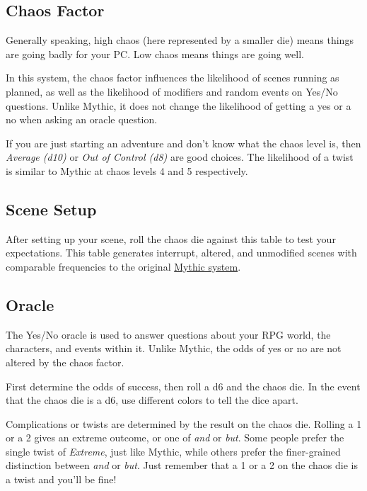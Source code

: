 \begin{multicols}{2}
\clearfloat{}

\subsection{Chaos Factor}
Generally speaking, high chaos (here represented by a smaller die) means things
are going badly for your PC\@. Low chaos means things are going well.

In this system, the chaos factor influences the likelihood of scenes running as
planned, as well as the likelihood of modifiers and random events on Yes/No
questions. Unlike Mythic, it does not change the likelihood of getting a yes or
a no when asking an oracle question.

If you are just starting an adventure and don't know what the chaos level is,
then \emph{Average (d10)} or \emph{Out of Control (d8)} are good choices.
The likelihood of a twist is similar to Mythic at chaos levels 4 and 5 respectively.



\subsection{Scene Setup}
After setting up your scene, roll the chaos die against this table to test your
expectations. This table generates interrupt, altered, and unmodified scenes
with comparable frequencies to the original
\href{https://www.wordmillgames.com/mythic-gme.html}{Mythic system}.


\subsection{Oracle}
The Yes/No oracle is used to answer questions about your RPG world, the
characters, and events within it. Unlike Mythic, the odds of yes or no are not
altered by the chaos factor.

First determine the odds of success, then roll a d6 and the chaos die. In the
event that the chaos die is a d6, use different colors to tell the dice apart.

Complications or twists are determined by the result on the chaos die. Rolling
a 1 or a 2 gives an extreme outcome, or one of \emph{and} or \emph{but}.
Some people prefer the single twist of \emph{Extreme}, just like Mythic, while others
prefer the finer-grained distinction between \emph{and} or \emph{but}.
Just remember that a 1 or a 2 on the chaos die is a twist and you'll be fine!



\vfill
\end{multicols}

